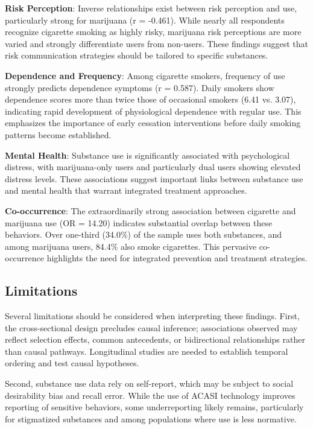 \documentclass[conference]{IEEEtran}
\begin{document}
\textbf{Risk Perception}: Inverse relationships exist between risk perception and use, particularly strong for marijuana (r = -0.461). While nearly all respondents recognize cigarette smoking as highly risky, marijuana risk perceptions are more varied and strongly differentiate users from non-users. These findings suggest that risk communication strategies should be tailored to specific substances.

\textbf{Dependence and Frequency}: Among cigarette smokers, frequency of use strongly predicts dependence symptoms (r = 0.587). Daily smokers show dependence scores more than twice those of occasional smokers (6.41 vs. 3.07), indicating rapid development of physiological dependence with regular use. This emphasizes the importance of early cessation interventions before daily smoking patterns become established.

\textbf{Mental Health}: Substance use is significantly associated with psychological distress, with marijuana-only users and particularly dual users showing elevated distress levels. These associations suggest important links between substance use and mental health that warrant integrated treatment approaches.

\textbf{Co-occurrence}: The extraordinarily strong association between cigarette and marijuana use (OR = 14.20) indicates substantial overlap between these behaviors. Over one-third (34.0\%) of the sample uses both substances, and among marijuana users, 84.4\% also smoke cigarettes. This pervasive co-occurrence highlights the need for integrated prevention and treatment strategies.

\subsection{Limitations}

Several limitations should be considered when interpreting these findings. First, the cross-sectional design precludes causal inference; associations observed may reflect selection effects, common antecedents, or bidirectional relationships rather than causal pathways. Longitudinal studies are needed to establish temporal ordering and test causal hypotheses.

Second, substance use data rely on self-report, which may be subject to social desirability bias and recall error. While the use of ACASI technology improves reporting of sensitive behaviors, some underreporting likely remains, particularly for stigmatized substances and among populations where use is less normative.
\end{document}
